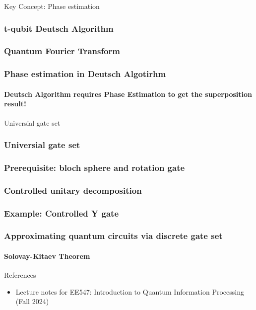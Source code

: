 \documentclass[9pt]{beamer}
\begin{document}
    \begin{section}{Key Concept: Phase estimation}
        \begin{frame}
            \frametitle{t-qubit Deutsch Algorithm}

        \end{frame}

        \begin{frame}
            \frametitle{Quantum Fourier Transform}

        \end{frame}

        \begin{frame}
            \frametitle{Phase estimation in Deutsch Algotirhm}
            \framesubtitle{Deutsch Algorithm requires Phase Estimation to get the superposition result!}
            
        \end{frame}
    \end{section}

    \begin{section}{Universial gate set}
        \begin{frame}
            \frametitle{Universial gate set}
            
        \end{frame}

        \begin{frame}
            \frametitle{Prerequisite: bloch sphere and rotation gate}
            
        \end{frame}

        \begin{frame}
            \frametitle{Controlled unitary decomposition}
            
        \end{frame}

        \begin{frame}
            \frametitle{Example: Controlled Y gate}
            
        \end{frame}

        \begin{frame}
            \frametitle{Approximating quantum circuits via discrete gate set}
            \framesubtitle{Solovay-Kitaev Theorem}
            
        \end{frame}
    \end{section}

    \begin{frame}{References}
        
        \begin{itemize}
            \item Lecture notes for EE547: Introduction to Quantum Information Processing (Fall 2024)
        \end{itemize}
        \vspace{6cm}
    \end{frame}
\end{document}

